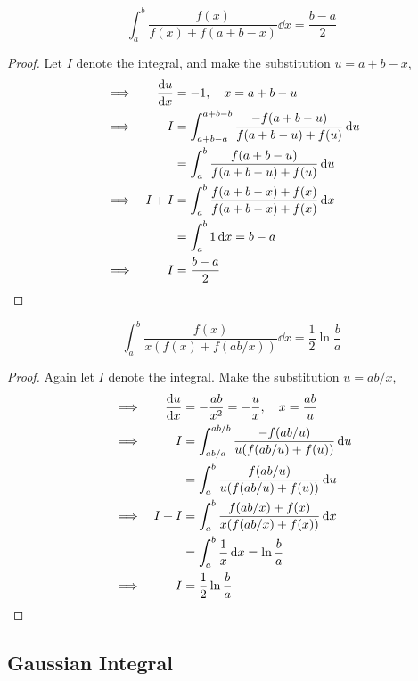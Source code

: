 \begin{theorem}
\begin{equation*}
\int_a^b \frac{f(x)}{f(x) + f(a + b - x)} \dd{x} = \frac{b - a} 2
\end{equation*}
\end{theorem}
\begin{proof}
Let \(I\) denote the integral, and make the substitution \(u = a + b - x\),
\begin{alignat*}{2}
&\implies& \dv{u}{x} &= -1, \quad x = a + b - u \\
&\implies& I &= \int_{a + b - a}^{a + b - b}
                    \frac{-f(a + b - u)}{f(a + b - u) + f(u)} \dd{u} \\
&&  &= \int_a^b \frac{f(a + b - u)}{f(a + b - u) + f(u)} \dd{u} \\
&\implies& I + I &= \int_a^b
                    \frac{f(a + b - x) + f(x)}
                         {f(a + b - x) + f(x)} \dd{x} \\
&&  &= \int_a^b 1 \dd{x} = b - a \\
&\implies& I &= \frac{b - a} 2 \tag*{\qedhere}
\end{alignat*}
\end{proof}
\begin{theorem}
\begin{equation*}
\int_a^b \frac{f(x)}{x(f(x) + f(ab / x))} \dd{x} = \frac 12 \ln \frac ba
\end{equation*}
\end{theorem}
\begin{proof}
Again let \(I\) denote the integral. Make the substitution \(u = ab / x\),
\begin{alignat*}{2}
&\implies& \dv{u}{x} &= -\frac{ab}{x^2} = -\frac ux, \quad x = \frac{ab}u \\
&\implies& I &= \int_{ab/a}^{ab/b} \frac{-f(ab / u)}{u(f(ab / u) + f(u))}
    \dd{u} \\
&& &= \int_a^b \frac{f(ab / u)}{u(f(ab / u) + f(u))} \dd{u} \\
&\implies& I + I &= \int_a^b \frac{f(ab / x) + f(x)}
                                  {x(f(ab / x) + f(x))} \dd{x} \\
&& &= \int_a^b \frac 1x \dd{x} = \ln \frac ba \\
&\implies& I &= \frac 12 \ln \frac ba \tag*{\qedhere}
\end{alignat*}
\end{proof}

\subsection{Gaussian Integral}

